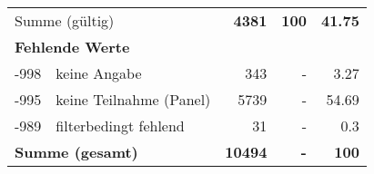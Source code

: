 \begin{longtable}{lXrrr}
     \midrule
     \multicolumn{2}{l}{Summe (gültig)} &
       \textbf{\num{4381}} &
     \textbf{100} &
       \textbf{\num[round-mode=places,round-precision=2]{41,75}} \\
     \multicolumn{5}{l}{\textbf{Fehlende Werte}}\\
       -998 &
       keine Angabe &
         \num{343} &
        - &
         \num[round-mode=places,round-precision=2]{3,27} \\
       -995 &
       keine Teilnahme (Panel) &
         \num{5739} &
        - &
         \num[round-mode=places,round-precision=2]{54,69} \\
       -989 &
       filterbedingt fehlend &
         \num{31} &
        - &
         \num[round-mode=places,round-precision=2]{0,3} \\
     \midrule
     \multicolumn{2}{l}{\textbf{Summe (gesamt)}} &
          \textbf{\num{10494}} &
        \textbf{-} &
        \textbf{100} \\
     \bottomrule
     \end{longtable}
     
